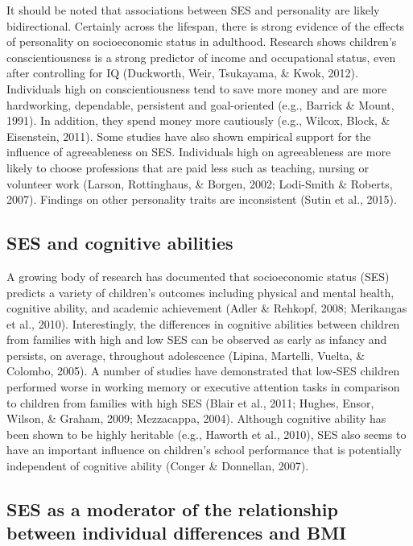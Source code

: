 \documentclass[man]{apa6}
\begin{document}
It should be noted that associations between SES and personality are likely bidirectional. Certainly across the lifespan, there is strong evidence of the effects of personality on socioeconomic status in adulthood. Research shows children's conscientiousness is a strong predictor of income and occupational status, even after controlling for IQ (Duckworth, Weir, Tsukayama, \& Kwok, 2012). Individuals high on conscientiousness tend to save more money and are more hardworking, dependable, persistent and goal-oriented (e.g., Barrick \& Mount, 1991). In addition, they spend money more cautiously (e.g., Wilcox, Block, \& Eisenstein, 2011). Some studies have also shown empirical support for the influence of agreeableness on SES. Individuals high on agreeableness are more likely to choose professions that are paid less such as teaching, nursing or volunteer work (Larson, Rottinghaus, \& Borgen, 2002; Lodi-Smith \& Roberts, 2007). Findings on other personality traits are inconsistent (Sutin et al., 2015).

\hypertarget{ses-and-cognitive-abilities}{%
\subsection{SES and cognitive abilities}\label{ses-and-cognitive-abilities}}

A growing body of research has documented that socioeconomic status (SES) predicts a variety of children's outcomes including physical and mental health, cognitive ability, and academic achievement (Adler \& Rehkopf, 2008; Merikangas et al., 2010). Interestingly, the differences in cognitive abilities between children from families with high and low SES can be observed as early as infancy and persists, on average, throughout adolescence (Lipina, Martelli, Vuelta, \& Colombo, 2005). A number of studies have demonstrated that low-SES children performed worse in working memory or executive attention tasks in comparison to children from families with high SES (Blair et al., 2011; Hughes, Ensor, Wilson, \& Graham, 2009; Mezzacappa, 2004). Although cognitive ability has been shown to be highly heritable (e.g., Haworth et al., 2010), SES also seems to have an important influence on children's school performance that is potentially independent of cognitive ability (Conger \& Donnellan, 2007).

\hypertarget{ses-as-a-moderator-of-the-relationship-between-individual-differences-and-bmi}{%
\subsection{SES as a moderator of the relationship between individual differences and BMI}\label{ses-as-a-moderator-of-the-relationship-between-individual-differences-and-bmi}}
\end{document}

